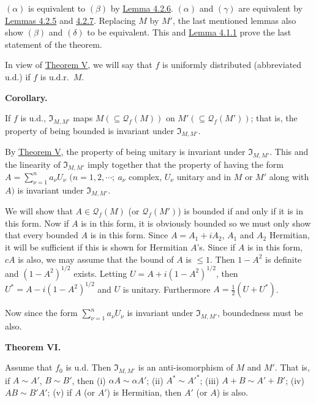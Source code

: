 \documentclass[twoside,leqno]{article}
\newcommand{\Q}{\mathcal{Q}}
\newcommand{\StatementTarget}[1]{\phantomsection\hypertarget{stmt:#1}{}}
\newcommand{\StatementRef}[2]{\hyperlink{stmt:#1}{#2}}
\newenvironment{statement}[2]{%
  \par\medskip
  \noindent\StatementTarget{#1}\hspace*{\parindent}\textbf{#2.}\ \itshape\ignorespaces
}{\par}
\begin{document}
\((\alpha)\) is equivalent to \((\beta)\) by
\StatementRef{lem:4.2.6}{Lemma 4.2.6}. \((\alpha)\) and \((\gamma)\) are
equivalent by \StatementRef{lem:4.2.5}{Lemmas 4.2.5} and
\StatementRef{lem:4.2.7}{4.2.7}. Replacing \(M\) by \(M'\), the last
mentioned lemmas also show \((\beta)\) and \((\delta)\) to be equivalent.
This and \StatementRef{lemma:4.1.1}{Lemma 4.1.1} prove the last statement
of the theorem.

In view of \StatementRef{thm:V}{Theorem V}, we will say that \(f\) is
uniformly distributed (abbreviated u.d.) if \(f\) is u.d.r.\ \(M\).

\begin{statement}{cor:V}{Corollary}
If \(f\) is u.d., \(\mathfrak I_{M,M'}\) maps
\(M(\subseteq\Q_f(M))\) on \(M'(\subseteq\Q_f(M'))\); that is, the property
of being bounded is invariant under \(\mathfrak I_{M,M'}\).
\end{statement}

By \StatementRef{thm:V}{Theorem V}, the property of being unitary is
invariant under \(\mathfrak I_{M,M'}\). This and the linearity of
\(\mathfrak I_{M,M'}\) imply together that the property of having the form
\(A=\sum_{\nu=1}^{n}a_\nu U_\nu\)
\((n=1,2,\cdots;\ a_\nu\) complex, \(U_\nu\) unitary and in \(M\) or \(M'\)
along with \(A)\) is invariant under \(\mathfrak I_{M,M'}\).

We will show that \(A\in\Q_f(M)\) (or \(\Q_f(M')\)) is bounded if and only
if it is in this form. Now if \(A\) is in this form, it is obviously bounded
so we must only show that every bounded \(A\) is in this form. Since
\(A=A_1+iA_2\), \(A_1\) and \(A_2\) Hermitian, it will be sufficient if this
is shown for Hermitian \(A\)'s. Since if \(A\) is in this form, \(cA\) is
also, we may assume that the bound of \(A\) is \(\leq1\). Then \(1-A^2\)
is definite and \((1-A^2)^{1/2}\) exists. Letting
\(U=A+i(1-A^2)^{1/2}\),
then \(U^*=A-i(1-A^2)^{1/2}\) and \(U\) is unitary. Furthermore
\(A=\frac12(U+U^*)\).

Now since the form \(\sum_{\nu=1}^{n}a_\nu U_\nu\) is invariant under
\(\mathfrak I_{M,M'}\), boundedness must be also.

\begin{statement}{thm:VI}{Theorem VI}
Assume that \(f_0\) is u.d. Then \(\mathfrak I_{M,M'}\) is an
anti-isomorphism of \(M\) and \(M'\). That is, if \(A\sim A'\),
\(B\sim B'\), then (i) \(\alpha A\sim\alpha A'\); (ii)
\(A^*\sim A'^*\); (iii) \(A+B\sim A'+B'\); (iv) \(AB\sim B'A'\);
(v) if \(A\) (or \(A'\)) is Hermitian, then \(A'\) (or \(A\)) is also.
\end{statement}
\end{document}
